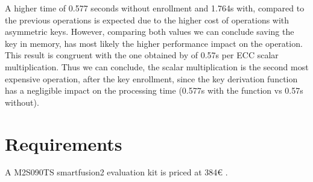 A higher time of 0.577 seconds without enrollment and 1.764s with, compared to the previous operations is expected due to the higher cost of operations with asymmetric keys.
However, comparing both values we can conclude saving the key in memory, has most likely the higher performance impact on the operation.
This result is congruent with the one obtained by \cite{parrinha2017flexible} of 0.57s per ECC scalar multiplication.
Thus we can conclude, the scalar multiplication is the second most expensive operation, after the key enrollment, since the key derivation function has a negligible impact on the processing time (0.577s with the function vs 0.57s without).

\section{Requirements}\label{chap:evaluation:requirements}

A M2S090TS smartfusion2 evaluation kit is priced at 384€ \cite{smartfusionPrice}.


